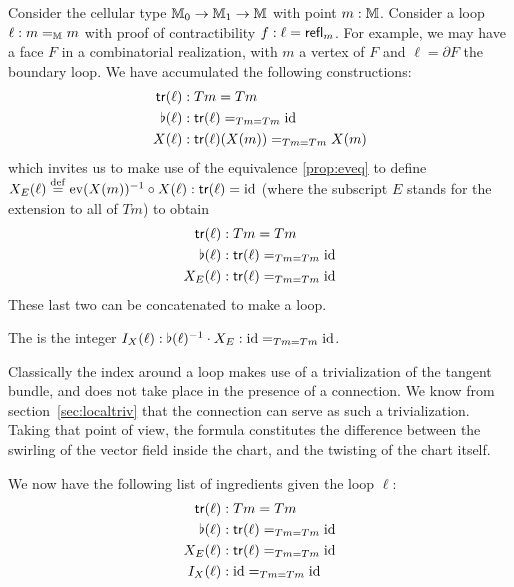 Consider the cellular type \( \mathbb{M}_0\to\mathbb{M}_1\to\mathbb{M} \) with point \( m:\mathbb{M} \). Consider a loop \( \ell:m=_{\mathbb{M}} m \) with proof of contractibility \( f:\ell=\mathsf{refl}_m \). For example, we may have a face \( F \) in a combinatorial realization, with \( m \) a vertex of \( F \) and \( \ell=\partial F \) the boundary loop. We have accumulated the following constructions:
\[\begin{aligned}
\mathsf{tr}(\ell)&:Tm=Tm\\
\flat(\ell)&:\mathsf{tr}(\ell)=_{Tm=Tm}\text{id}\\
X(\ell)&:\mathsf{tr}(\ell)(X(m))=_{Tm=Tm}X(m)\\
\end{aligned}\]
which invites us to make use of the equivalence \ref{prop:eveq} to define \( X_E(\ell)\stackrel{\mathrm{def}}{=} \mathrm{ev}(X(m))^{-1}\circ X(\ell):\mathsf{tr}(\ell)=\text{id} \) (where the subscript \( E \) stands for the extension to all of \( Tm \)) to obtain
\[
\begin{aligned}
\mathsf{tr}(\ell)&:Tm=Tm\\
\flat(\ell)&:\mathsf{tr}(\ell)=_{Tm=Tm}\text{id}\\
X_E(\ell)&:\mathsf{tr}(\ell)=_{Tm=Tm}\text{id}\\
\end{aligned}
\]
These last two can be concatenated to make a loop.
\begin{mydef}
The  is the integer \( I_X(\ell):\flat(\ell)^{-1}\cdot X_E:\text{id}=_{Tm=Tm}\text{id} \).
\end{mydef}
\begin{mynote}
Classically the index around a loop makes use of a trivialization of the tangent bundle, and does not take place in the presence of a connection. We know from section~\ref{sec:localtriv} that the connection can serve as such a trivialization. Taking that point of view, the formula constitutes the difference between the swirling of the vector field inside the chart, and the twisting of the chart itself. 
\end{mynote}
We now have the following list of ingredients given the loop \( \ell \):
\begin{equation}
\label{eq:face_elements}
\begin{aligned}
\mathsf{tr}(\ell)&:Tm=Tm\\
\flat(\ell)&:\mathsf{tr}(\ell)=_{Tm=Tm}\text{id}\\
X_E(\ell)&:\mathsf{tr}(\ell)=_{Tm=Tm}\text{id}\\
I_X(\ell)&:\text{id}=_{Tm=Tm}\text{id}\\
\end{aligned}
\end{equation}

